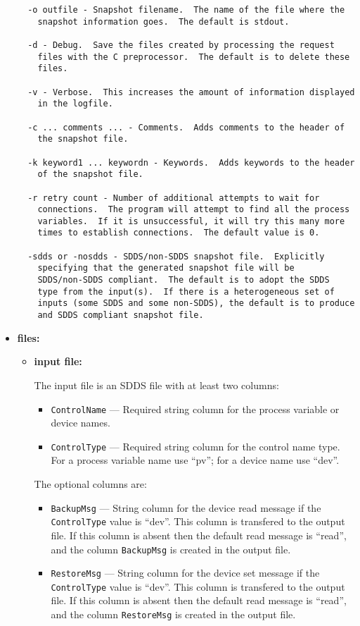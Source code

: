 \begin{itemize}
\begin{verbatim}
  -o outfile - Snapshot filename.  The name of the file where the
  	snapshot information goes.  The default is stdout.

  -d - Debug.  Save the files created by processing the request
  	files with the C preprocessor.  The default is to delete these
  	files.

  -v - Verbose.  This increases the amount of information displayed
  	in the logfile.

  -c ... comments ... - Comments.  Adds comments to the header of
  	the snapshot file.

  -k keyword1 ... keywordn - Keywords.  Adds keywords to the header
  	of the snapshot file.

  -r retry count - Number of additional attempts to wait for
  	connections.  The program will attempt to find all the process
  	variables.  If it is unsuccessful, it will try this many more
  	times to establish connections.  The default value is 0.

  -sdds or -nosdds - SDDS/non-SDDS snapshot file.  Explicitly
  	specifying that the generated snapshot file will be 
  	SDDS/non-SDDS compliant.  The default is to adopt the SDDS
  	type from the input(s).  If there is a heterogeneous set of
  	inputs (some SDDS and some non-SDDS), the default is to produce
  	and SDDS compliant snapshot file.

\end{verbatim}
\item {\bf files:}
\begin{itemize}
\item {\bf input file:} \par
The input file is an SDDS file with at least two columns:
\begin{itemize}
        \item {\tt ControlName} --- Required string column for the process variable or device names.
        \item {\tt ControlType} --- Required string column for the control name type. For a 
                process variable name use ``pv''; for a device name use ``dev''.
\end{itemize}
The optional columns are:
\begin{itemize}
        \item {\tt BackupMsg} --- String column for the device read message if the {\tt ControlType} value is ``dev''. 
                This column is transfered to the output file. 
                If this column is absent then the default read message is ``read'', and the column {\tt BackupMsg} is created in the output file.
        \item {\tt RestoreMsg} --- String column for the device set message if the {\tt ControlType} value is ``dev''.
                This column is transfered to the output file. 
                If this column is absent then the default read message is ``read'', and the column {\tt RestoreMsg} is created in the output file.
\end{itemize}


\end{itemize}
\end{itemize}
